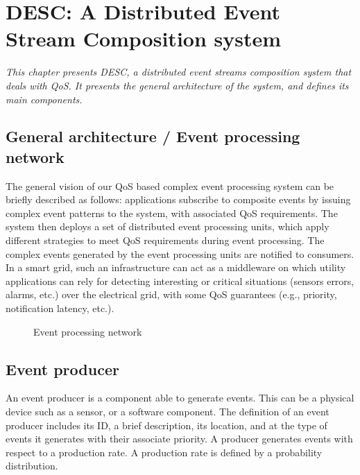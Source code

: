 \chapter{DESC: A Distributed Event Stream Composition system}
\label{ch4}
\textit{This chapter presents DESC, a distributed event streams composition system that deals with QoS. It presents the general architecture of the system, and defines its main components.}
\vspace{5cm}
\vspace{2ex}\vfill
\minitoc


\section{General architecture / Event processing network}
The general vision of our QoS based complex event processing system can be briefly described as follows: applications subscribe to composite events by issuing complex event patterns to the system, with associated QoS requirements. The system then deploys a set of distributed event processing units, which apply different strategies to meet QoS requirements during event processing. The complex events generated by the event processing units are notified to consumers. In a smart grid, such an infrastructure can act as a middleware on which utility applications can rely for detecting interesting or critical situations (sensors errors, alarms, etc.) over the electrical grid, with some QoS guarantees (e.g., priority, notification latency, etc.).
\begin{figure}[htbp]
  \centering
   {}
  \caption{Event processing network}
  \label{fig:epn}
 \end{figure}

\section{Event producer}
An event producer is a component able to generate events. This can be a physical device such as a sensor, or a software component. The definition of an event producer includes its ID, a brief description, its location, and at the type of events it generates with their associate priority. A producer generates events with respect to a production rate. A production rate is defined by a probability distribution.

